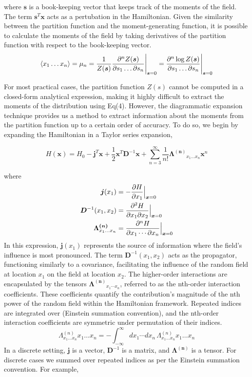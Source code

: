 \documentclass[letterpaper,12pt]{article}
\begin{document}
where $\bm{s}$ is a book-keeping vector that keeps track of the moments of the field.
The term $\bm{s}^{T}\bm{x}$ acts as a pertubation in the Hamiltonian.
Given the similarity between the partition function and the moment-generating function, it is possible to calculate the moments of the field by taking derivatives of the partition function with respect to the book-keeping vector.
\begin{equation}
    \expval{ x_{1} \dots x_{n} } = \mu_{n} = \frac{1}{Z(\bm{s})}\pdv{^{n}Z(\bm{s})}{s_{1} \dots \partial s_{n}}\Bigg|_{\bm{s}=0} = \pdv{^{n}\log Z(\bm{s})}{s_{1} \dots \partial s_{n}}\Bigg|_{\bm{s}=0}
\end{equation}

For most practical cases, the partition function $Z(s)$ cannot be computed in a closed-form analytical expression, making it highly difficult to extract the moments of the distribution using Eq(4).
However, the diagrammatic expansion technique provides us a method to extract information about the moments from the partition function up to a certain order of accuracy. 
To do so, we begin by expanding the Hamiltonian in a Taylor series expansion,

\begin{equation}
    H(\bm{x}) = H_{0} - \bm{j}^{T}\bm{x} + \frac{1}{2}\bm{x}^{T}\bm{D}^{-1}\bm{x} + \sum_{n=3}^{\infty} \frac{1}{n!} \bm{\Lambda^{(n)}}_{x_{1} \dots x_{n}}\bm{x}^{n}
\end{equation}

where 
\begin{eqnarray}
    \bm{j}(x_{1}) &= -\pdv{H}{x_{1}} \Big|_{\bm{x}=0} \\
    \bm{D}^{-1}(x_{1}, x_{2}) &= \pdv{^{2}H}{x_{1} \partial x_{2}} \Big|_{\bm{x}=0} \\
    \bm{\Lambda^{(n)}}_{x_{1} \dots x_{n}} &= \pdv{^{n}H}{x_{1} \cdots \partial x_{n}} \Big|_{\bm{x}=0}
\end{eqnarray}
In this expression, $\bm{j}(x_{1})$ represents the source of information where the field's influence is most pronounced. The term $\bm{D}^{-1}(x_{1}, x_{2})$ acts as the propagator, functioning similarly to a covariance, facilitating the influence of the random field at location $x_{1}$ on the field at location $x_{2}$. 
The higher-order interactions are encapsulated by the tensors $\bm{\Lambda^{(n)}}_{x_{1} \cdots x_{n}}$, referred to as the nth-order interaction coefficients. These coefficients quantify the contribution's magnitude of the nth power of the random field within the Hamiltonian framework. 
Repeated indices are integrated over (Einstein summation convention), and the nth-order interaction coefficients are symmetric under permutation of their indices.
\begin{equation}
    \Lambda^{(n)}_{x_{1} \dots x_{n}} x_{1} \dots x_{n} = -\int_{-\infty}^{\infty} dx_{1} \cdots dx_{n} \, \Lambda^{(n)}_{x_{1} \dots x_{n}} x_{1} \dots x_{n} 
\end{equation}
In a discrete setting, $\bm{j}$ is a vector, $\bm{D}^{-1}$ is a matrix, and $\bm{\Lambda^{(n)}}$ is a tensor. For discrete cases we summed over repeated indices as per the Einstein summation convention. For example,
\end{document}
